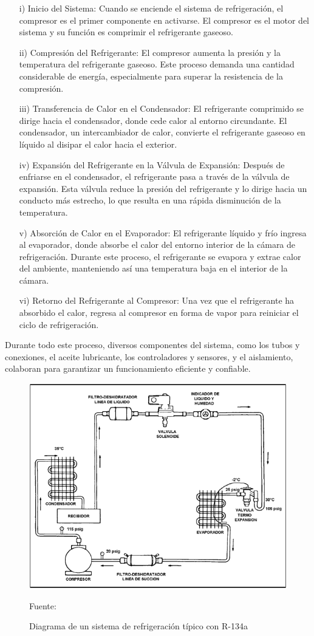 \begin{enumerate}
	\begin{enumerate}
		\item[i)] Inicio del Sistema: Cuando se enciende el sistema de refrigeración, el compresor es el primer componente en activarse. El compresor es el motor del sistema y su función es comprimir el refrigerante gaseoso.
		\item[ii)] Compresión del Refrigerante: El compresor aumenta la presión y la temperatura del refrigerante gaseoso. Este proceso demanda una cantidad considerable de energía, especialmente para superar la resistencia de la compresión.
		\item[iii)] Transferencia de Calor en el Condensador: El refrigerante comprimido se dirige hacia el condensador, donde cede calor al entorno circundante. El condensador, un intercambiador de calor, convierte el refrigerante gaseoso en líquido al disipar el calor hacia el exterior.
		\item[iv)] Expansión del Refrigerante en la Válvula de Expansión: Después de enfriarse en el condensador, el refrigerante pasa a través de la válvula de expansión. Esta válvula reduce la presión del refrigerante y lo dirige hacia un conducto más estrecho, lo que resulta en una rápida disminución de la temperatura.
		\item[v)] Absorción de Calor en el Evaporador: El refrigerante líquido y frío ingresa al evaporador, donde absorbe el calor del entorno interior de la cámara de refrigeración. Durante este proceso, el refrigerante se evapora y extrae calor del ambiente, manteniendo así una temperatura baja en el interior de la cámara.
		\item[vi)]Retorno del Refrigerante al Compresor: Una vez que el refrigerante ha absorbido el calor, regresa al compresor en forma de vapor para reiniciar el ciclo de refrigeración.
	\end{enumerate}
	Durante todo este proceso, diversos componentes del sistema, como los tubos y conexiones, el aceite lubricante, los controladores y sensores, y el aislamiento, colaboran para garantizar un funcionamiento eficiente y confiable. \cite{neoattack-2023,cengel-2009}
	
	\begin{figure}[H]
		\centering
		\includegraphics[width=0.5\linewidth]{figures/ciclo-ref}
		\caption{Diagrama de un sistema de refrigeración típico con R-134a}
		\label{fig:ciclo-ref} Fuente: \cite{agustin}
	\end{figure}
	

\end{enumerate}

